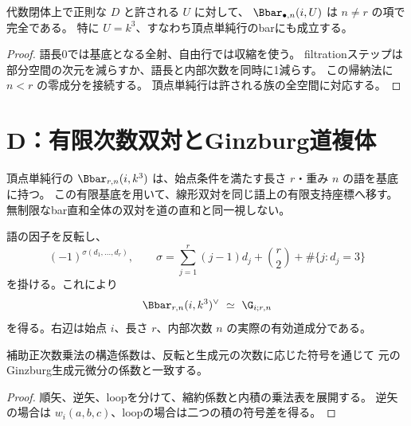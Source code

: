 \begin{theorem}[実際のbarの対角外完全性]\label{thm:bar-off-diagonal}
\leanok
{}
代数閉体上で正則な $D$ と許される $U$ に対して、
$\Bbar_{\bullet,n}(i,U)$ は $n\ne r$ の項で完全である。
特に $U=k^3$、すなわち頂点単純行のbarにも成立する。
\end{theorem}
\begin{proof}\leanok
語長0では基底となる全射、自由行では収縮を使う。
filtrationステップは部分空間の次元を減らすか、語長と内部次数を同時に1減らす。
この帰納法に $n<r$ の零成分を接続する。
頂点単純行は許される族の全空間に対応する。
\end{proof}

\section{D：有限次数双対とGinzburg道複体}

\begin{definition}[有限次数の双対座標]\label{def:finite-dual}
\leanok
{}
頂点単純行の $\Bbar_{r,n}(i,k^3)$ は、始点条件を満たす長さ $r$・重み $n$ の語を基底に持つ。
この有限基底を用いて、線形双対を同じ語上の有限支持座標へ移す。
無制限なbar直和全体の双対を道の直和と同一視しない。
\end{definition}

\begin{definition}[符号付き因子反転]\label{def:reversal}
\leanok
{}
語の因子を反転し、
\[
 (-1)^{\sigma(d_1,\ldots,d_r)},\qquad
 \sigma=\sum_{j=1}^r(j-1)d_j+\binom r2+\#\{j:d_j=3\}
\]
を掛ける。これにより
\[
 \Bbar_{r,n}(i,k^3)^\vee\ \simeq\ \G_{i;r,n}
\]
を得る。右辺は始点 $i$、長さ $r$、内部次数 $n$ の実際の有効道成分である。
\end{definition}

\begin{lemma}[生成元係数の一致]\label{lem:generator-coefficients}
\leanok
{}
補助正次数乗法の構造係数は、反転と生成元の次数に応じた符号を通じて
元のGinzburg生成元微分の係数と一致する。
\end{lemma}
\begin{proof}\leanok
順矢、逆矢、loopを分けて、縮約係数と内積の乗法表を展開する。
逆矢の場合は $w_i(a,b,c)$、loopの場合は二つの積の符号差を得る。
\end{proof}

